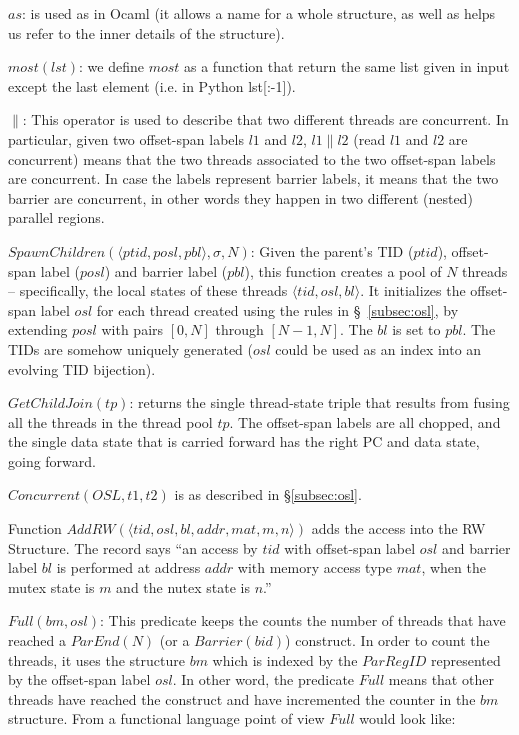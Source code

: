\begin{compactitem}
\item $as$: is used as in Ocaml (it allows a name for a whole structure, as
  well as helps us refer to the inner details of the structure).
\item $most(lst)$: we define $most$ as a function that return the same list
  given in input except the last element (i.e. in Python lst[:-1]).
\item $\parallel$: This operator is used to describe that two different
  threads are concurrent.
  In particular, given two offset-span labels $l1$ and $l2$, $l1 \parallel l2$
  (read $l1$ and $l2$ are concurrent) means that the two threads associated to
  the two offset-span labels are concurrent.
  In case the labels represent barrier labels, it means that the two barrier
  are concurrent, in other words they happen in two different (nested)
  parallel regions.
\item $SpawnChildren(\langle ptid, posl, pbl \rangle, \sigma, N)$: Given the
  parent's TID ($ptid$), offset-span label ($posl$) and barrier label ($pbl$),
  this function creates a pool of $N$ threads -- specifically, the local
  states of these threads $\langle tid, osl, bl \rangle$.
  It initializes the offset-span label $osl$ for each thread created using the
  rules in \S~\ref{subsec:osl}, by extending $posl$ with pairs $[0,N]$ through
  $[N-1,N]$.
  The $bl$ is set to $pbl$.
  The TIDs are somehow uniquely generated ($osl$ could be used as an index
  into an evolving TID bijection).
\item $GetChildJoin(tp)$: returns the single thread-state triple that results
  from fusing all the threads in the thread pool $tp$.
  The offset-span labels are all chopped, and the single data state that is
  carried forward has the right PC and data state, going forward.
\item $Concurrent(OSL, t1, t2)$ is as described in \S\ref{subsec:osl}.
\item Function $AddRW(\langle tid, osl, bl, addr, mat, m, n \rangle)$ adds the
  access into the RW Structure.
  The record says ``an access by $tid$ with offset-span label $osl$ and
  barrier label $bl$ is performed at address $addr$ with memory access type
  $mat$, when the mutex state is $m$ and the nutex state is $n$.''
\item $Full(bm, osl)$: This predicate keeps the counts the number of threads
  that have reached a $ParEnd(N)$ (or a $Barrier(bid)$) construct.
  In order to count the threads, it uses the structure $bm$ which is indexed
  by the $ParRegID$ represented by the offset-span label $osl$.
  In other word, the predicate $Full$ means that other threads have reached
  the construct and have incremented the counter in the $bm$ structure.
  From a functional language point of view $Full$ would look like:


\end{compactitem}
